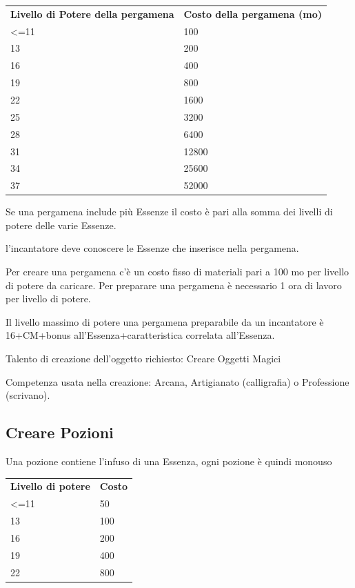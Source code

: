 \documentclass[a4paper,11pt,twoside,openany]{book}
\begin{document}
\begin{tabular}{ll}
	\toprule
	\textbf{Livello di Potere della pergamena} & \textbf{Costo della pergamena (mo)}\\
	\textless=11               & 100\\
	13         & 200\\
	16         & 400\\
	19         & 800\\
	22         & 1600\\
	25         & 3200\\
	28         & 6400\\
	31         & 12800\\
	34         & 25600\\
	37         & 52000\\
\end{tabular}

\bigskip

Se una pergamena include più Essenze il costo è pari alla somma dei livelli di potere delle varie Essenze.

l'incantatore deve conoscere le Essenze che inserisce nella pergamena.

Per creare una pergamena c'è un costo fisso di materiali pari a 100 mo per livello di potere da caricare. Per preparare una pergamena è necessario 1 ora di lavoro per livello di potere.

Il livello massimo di potere una pergamena preparabile da un incantatore è 16+CM+bonus all'Essenza+caratteristica correlata all'Essenza.

Talento di creazione dell'oggetto richiesto: Creare Oggetti Magici

Competenza usata nella creazione: Arcana, Artigianato (calligrafia) o Professione (scrivano).

\subsection{Creare Pozioni}

Una pozione contiene l'infuso di una Essenza, ogni pozione è quindi monouso

\bigskip

\begin{tabular}{ll}
	\toprule
	\textbf{Livello di potere} & \textbf{Costo}\\
	\textless=11               & 50\\
	13         & 100\\
	16         & 200\\
	19         & 400\\
	22         & 800\\
\end{tabular}
\end{document}
